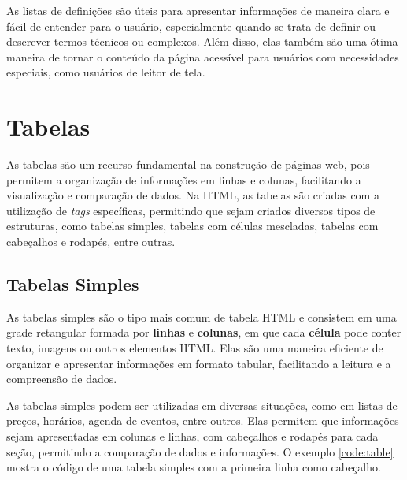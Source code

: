 As listas de definições são úteis para apresentar informações de maneira clara e fácil de entender para o usuário, especialmente quando se trata de definir ou descrever termos técnicos ou complexos. Além disso, elas também são uma ótima maneira de tornar o conteúdo da página acessível para usuários com necessidades especiais, como usuários de leitor de tela.

\section{Tabelas}

As tabelas são um recurso fundamental na construção de páginas web, pois permitem a organização de informações em linhas e colunas, facilitando a visualização e comparação de dados. Na HTML, as tabelas são criadas com a utilização de \textit{tags} específicas, permitindo que sejam criados diversos tipos de estruturas, como tabelas simples, tabelas com células mescladas, tabelas com cabeçalhos e rodapés, entre outras.

\subsection{Tabelas Simples}

As tabelas simples são o tipo mais comum de tabela HTML e consistem em uma grade retangular formada por \textbf{linhas} e \textbf{colunas}, em que cada \textbf{célula} pode conter texto, imagens ou outros elementos HTML. Elas são uma maneira eficiente de organizar e apresentar informações em formato tabular, facilitando a leitura e a compreensão de dados.

As tabelas simples podem ser utilizadas em diversas situações, como em listas de preços, horários, agenda de eventos, entre outros. Elas permitem que informações sejam apresentadas em colunas e linhas, com cabeçalhos e rodapés para cada seção, permitindo a comparação de dados e informações. O exemplo \ref{code:table} mostra o código de uma tabela simples com a primeira linha como cabeçalho.


